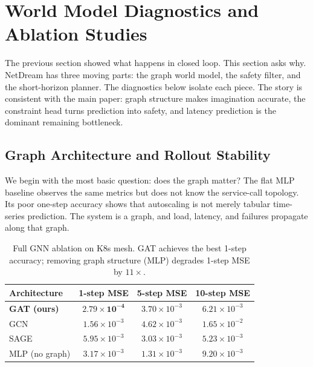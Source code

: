 \section{World Model Diagnostics and Ablation Studies}
\label{app:diagnostics}

The previous section showed what happens in closed loop.  This section
asks why.  NetDream has three moving parts: the graph world model, the
safety filter, and the short-horizon planner.  The diagnostics below
isolate each piece.  The story is consistent with the main paper: graph
structure makes imagination accurate, the constraint head turns
prediction into safety, and latency prediction is the dominant remaining
bottleneck.

\subsection{Graph Architecture and Rollout Stability}
\label{app:ablation}

We begin with the most basic question: does the graph matter?  The flat
MLP baseline observes the same metrics but does not know the service-call
topology.  Its poor one-step accuracy shows that autoscaling is not
merely tabular time-series prediction.  The system is a graph, and load,
latency, and failures propagate along that graph.

\begin{table}[H]
\centering
\small
\caption{Full GNN ablation on K8s mesh. GAT achieves the best 1-step
accuracy; removing graph structure (MLP) degrades 1-step MSE by $11\times$.}
\label{tab:full-ablation}
\begin{tabular}{@{}lccc@{}}
\toprule
Architecture & 1-step MSE & 5-step MSE & 10-step MSE \\
\midrule
\textbf{GAT (ours)} & $\mathbf{2.79 \times 10^{-4}}$ & $3.70 \times 10^{-3}$ & $6.21 \times 10^{-3}$ \\
GCN & $1.56 \times 10^{-3}$ & $4.62 \times 10^{-3}$ & $1.65 \times 10^{-2}$ \\
SAGE & $5.95 \times 10^{-3}$ & $3.03 \times 10^{-3}$ & $5.23 \times 10^{-3}$ \\
MLP (no graph) & $3.17 \times 10^{-3}$ & $1.31 \times 10^{-3}$ & $9.20 \times 10^{-3}$ \\
\bottomrule
\end{tabular}
\end{table}

